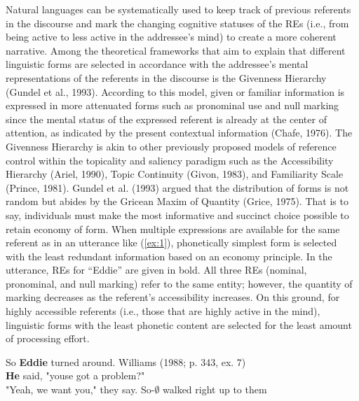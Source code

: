 \documentclass[]{elsarticle} %
\begin{document}
Natural languages can be systematically used to keep track of previous
referents in the discourse and mark the changing cognitive statuses of
the REs (i.e., from being active to less active in the addressee's mind)
to create a more coherent narrative. Among the theoretical frameworks
that aim to explain that different linguistic forms are selected in
accordance with the addressee's mental representations of the referents
in the discourse is the Givenness Hierarchy (Gundel et al., 1993).
According to this model, given or familiar information is expressed in
more attenuated forms such as pronominal use and null marking since the
mental status of the expressed referent is already at the center of
attention, as indicated by the present contextual information (Chafe,
1976). The Givenness Hierarchy is akin to other previously proposed
models of reference control within the topicality and saliency paradigm
such as the Accessibility Hierarchy (Ariel, 1990), Topic Continuity
(Givon, 1983), and Familiarity Scale (Prince, 1981). Gundel et al.
(1993) argued that the distribution of forms is not random but abides by
the Gricean Maxim of Quantity (Grice, 1975). That is to say, individuals
must make the most informative and succinct choice possible to retain
economy of form. When multiple expressions are available for the same
referent as in an utterance like (\ref{ex:1}), phonetically simplest
form is selected with the least redundant information based on an
economy principle. In the utterance, REs for ``Eddie'' are given in
bold. All three REs (nominal, pronominal, and null marking) refer to the
same entity; however, the quantity of marking decreases as the
referent's accessibility increases. On this ground, for highly
accessible referents (i.e., those that are highly active in the mind),
linguistic forms with the least phonetic content are selected for the
least amount of processing effort.

\begin{exe}
    \ex \label{ex:1}
    So \textbf{Eddie} turned around. \hfill Williams (1988; p. 343, ex. 7) \\
\textbf{He} said, "youse got a problem?" \\
"Yeah, we want you," they say.
So-$\pmb{\emptyset}$ walked right up to them \\
\end{exe}
\end{document}
